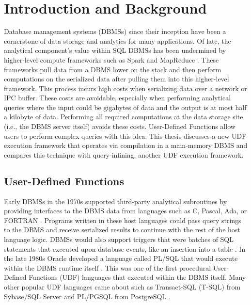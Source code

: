 \documentclass[12pt]{cmuthesis}
\begin{document}
\tableofcontents
\listoffigures
\listoflistings
\listoftables

\mainmatter

\chapter{Introduction and Background}
\label{sec:introduction}


Database management systems (DBMSs) since their inception have been a cornerstone of data storage and analytics for many applications. Of late, the analytical component's value within SQL DBMSs has been undermined by higher-level compute frameworks such as Spark and MapReduce \cite{dean04, zaharia10}. These frameworks pull data from a DBMS lower on the stack and then perform computations on the serialized data after pulling them into this higher-level framework. This process incurs high costs when serializing data over a network or IPC buffer. These costs are avoidable, especially when performing analytical queries where the input could be gigabytes of data and the output is at most half a kilobyte of data. Performing all required computations at the data storage site (i.e., the DBMS server itself) avoids these costs. User-Defined Functions allow users to perform complex queries with this idea. This thesis discusses a new UDF execution framework that operates via compilation in a main-memory DBMS and compares this technique with query-inlining, another UDF execution framework.\\

\section{User-Defined Functions}
\label{sub:udf}
Early DBMSs in the 1970s supported third-party analytical subroutines by providing interfaces to the DBMS data from languages such as C, Pascal, Ada, or FORTRAN \cite{ibi, jenkins1976using}. Programs written in these host languages could pass query strings to the DBMS and receive serialized results to continue with the rest of the host language logic. DBMSs would also support triggers that were batches of SQL statements that executed upon database events, like an insertion into a table \cite{plsqlhist}. In the late 1980s Oracle developed a language called PL/SQL that would execute within the DBMS runtime itself \cite{plsqlhist}. This was one of the first procedural User-Defined Functions (UDF) languages that executed within the DBMS itself. Many other popular UDF languages came about such as Transact-SQL (T-SQL) from Sybase/SQL Server and PL/PGSQL from PostgreSQL \cite{tsqlsybase, tsqlms, plpgsqlpg}.\\
\end{document}
